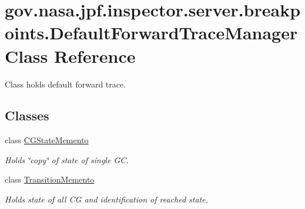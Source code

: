 \hypertarget{classgov_1_1nasa_1_1jpf_1_1inspector_1_1server_1_1breakpoints_1_1_default_forward_trace_manager}{}\section{gov.\+nasa.\+jpf.\+inspector.\+server.\+breakpoints.\+Default\+Forward\+Trace\+Manager Class Reference}
\label{classgov_1_1nasa_1_1jpf_1_1inspector_1_1server_1_1breakpoints_1_1_default_forward_trace_manager}


Class holds default forward trace.  


\subsection*{Classes}
\begin{DoxyCompactItemize}
\item 
class \hyperlink{classgov_1_1nasa_1_1jpf_1_1inspector_1_1server_1_1breakpoints_1_1_default_forward_trace_manager_1_1_c_g_state_memento}{C\+G\+State\+Memento}
\begin{DoxyCompactList}\small\item\em Holds \char`\"{}copy\char`\"{} of state of single GC. \end{DoxyCompactList}\item 
class \hyperlink{classgov_1_1nasa_1_1jpf_1_1inspector_1_1server_1_1breakpoints_1_1_default_forward_trace_manager_1_1_transition_memento}{Transition\+Memento}
\begin{DoxyCompactList}\small\item\em Holds state of all CG and identification of reached state. \end{DoxyCompactList}\end{DoxyCompactItemize}
